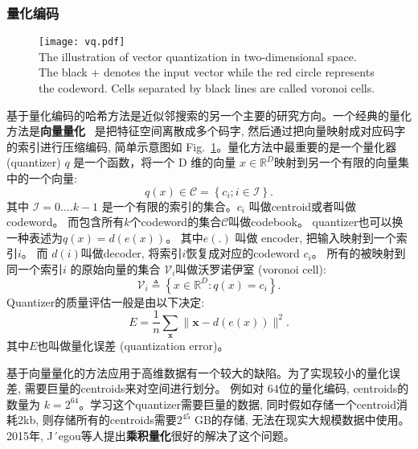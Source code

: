 \subsubsection{量化编码}
\begin{figure}[!htp]
    \centering
    \texttt{[image: vq.pdf]} \\
      {The illustration of vector quantization in two-dimensional space. The black + denotes the input vector while the red circle represents the codeword. Cells separated by black lines are called voronoi cells. }
   \label{fig:vectorquant}
\end{figure}
基于量化编码的哈希方法是近似邻搜索的另一个主要的研究方向。一个经典的量化方法是\textbf{向量量化} ~\cite{gray1984vector}是把特征空间离散成多个码字, 然后通过把向量映射成对应码字的索引进行压缩编码, 简单示意图如 Fig.~\ref{fig:vectorquant}。量化方法中最重要的是一个量化器 (quantizer)  $q$ 是一个函数，将一个 D 维的向量 $x \in \mathbb{R}^D$映射到另一个有限的向量集中的一个向量:
\begin{equation}
    q(x) \in \mathcal{C} = \left \{ c_i; i \in  \mathcal{I}\right\}.
    \label{eq:vector}
\end{equation}
其中 $\mathcal{I} = 0 .... k-1$ 是一个有限的索引的集合。$c_i$ 叫做centroid或者叫做codeword。  而包含所有$k$个codeword的集合$\mathcal{C}$叫做codebook。 quantizer也可以换一种表述为$q(x) = d(e(x))$。 其中$e(.)$ 叫做 encoder, 把输入映射到一个索引$i$。 而 $d(i)$叫做decoder, 将索引$i$恢复成对应的codeword $c_i$。 所有的被映射到同一个索引$i$ 的原始向量的集合 $\mathcal{V}_i$叫做沃罗诺伊室 (voronoi cell):
\begin{equation}
    \mathcal{V}_i \triangleq\left\{x \in \mathbb{R}^D: q(x)=c_i\right\}.
\end{equation}
Quantizer的质量评估一般是由以下决定:
\begin{equation}
    E=\frac{1}{n} \sum_{\mathbf{x}}\|\mathbf{x}- d(e(x))\|^2.
\end{equation}
其中$E$也叫做量化误差 (quantization error)。\par
基于向量量化的方法应用于高维数据有一个较大的缺陷。为了实现较小的量化误差, 需要巨量的centroids来对空间进行划分。 例如对 $64$位的量化编码, centroids的数量为 $k = 2^{64}$。学习这个quantizer需要巨量的数据, 同时假如存储一个centroid消耗2kb, 则存储所有的centroids需要$2^{45}$ GB的存储, 无法在现实大规模数据中使用。 2015年, J´egou等人提出\textbf{乘积量化}很好的解决了这个问题。\par
